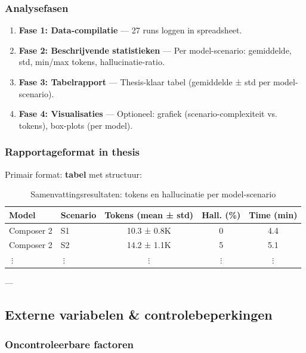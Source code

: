 \subsubsection{Analysefasen}

\begin{enumerate}
  \item \textbf{Fase 1: Data-compilatie} — 27 runs loggen in spreadsheet.
  \item \textbf{Fase 2: Beschrijvende statistieken} — Per model-scenario: gemiddelde, std, min/max tokens, hallucinatie-ratio.
  \item \textbf{Fase 3: Tabelrapport} — Thesis-klaar tabel (gemiddelde ± std per model-scenario).
  \item \textbf{Fase 4: Visualisaties} — Optioneel: grafiek (scenario-complexiteit vs. tokens), box-plots (per model).
\end{enumerate}

\subsubsection{Rapportageformat in thesis}

\noindent
Primair format: \textbf{tabel} met structuur:

\begin{table}[htbp]
  \centering
  \caption{Samenvattingsresultaten: tokens en hallucinatie per model-scenario}
  \label{tab:results-summary}
  \small
  \begin{tabularx}{\textwidth}{|l|l|c|c|c|}
    \hline
    \textbf{Model} & \textbf{Scenario} & 
    \textbf{Tokens (mean ± std)} & 
    \textbf{Hall. (\%)} & 
    \textbf{Time (min)} \\
    \hline
    Composer 2 & S1 & 10.3 ± 0.8K & 0 & 4.4 \\
    \hline
    Composer 2 & S2 & 14.2 ± 1.1K & 5 & 5.1 \\
    \hline
    \(⋮\) & \(⋮\) & \(⋮\) & \(⋮\) & \(⋮\) \\
    \hline
  \end{tabularx}
\end{table}

---

\subsection{Externe variabelen \& controlebeperkingen}

\subsubsection{Oncontroleerbare factoren}

